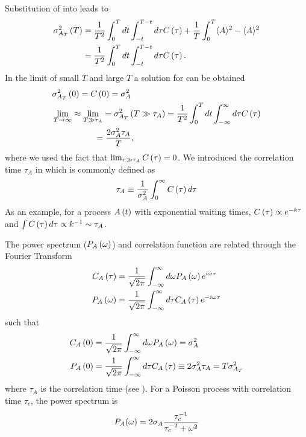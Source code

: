 Substitution of  into  leads to
\begin{align}
\sigma^2_{A_T}\br{T}&=\frac{1}{T^2}\int_0^T dt \int_{-t}^{T-t} d\tau C\br{\tau}+\frac{1}{T}\int_0^T \avg{A}^2-\avg{A}^2\\
\elabel{si:time_av_var4}
&=\frac{1}{T^2}\int_0^T dt \int_{-t}^{T-t} d\tau C\br{\tau}.
\end{align}
In the limit of small $T$ and large $T$ a solution for  can be obtained
\begin{align}
\elabel{si:limT_0_corr}
&\sigma^2_{A_T}\br{0}=C\br{0}=\sigma_A^2\\
\elabel{si:limT_infty_corr}
&\lim_{T\to\infty}\approx \lim_{T\gg \tau_A}=\sigma^2_{A_T}\br{T\gg \tau_A}=\frac{1}{T^2}\int_0^T dt \int_{-\infty}^{\infty} d\tau
C\br{\tau}\nonumber\\
&\quad\qquad\qquad=\frac{2\sigma_A^2\tau_A}{T},
\end{align}
where we used the fact that $\lim_{\tau\gg\tau_A} C\left ( \tau\right )=0$. We introduced the correlation time $\tau_A$ in 
which is commonly defined as
\begin{align}
\elabel{si:corr_time}
\tau_A\equiv \frac{1}{\sigma^2_A}\int_0^\infty C\br{\tau} d\tau
\end{align}
As an example, for a process $A\left ( t\right )$ with exponential waiting times, $C\left ( \tau\right )\propto e^{-k \tau}$ and $\int C\left ( \tau\right )d\tau \propto
k^{-1} \sim \tau_A$.

The power spectrum ($P_A\left ( \omega\right )$) and correlation function are related through the Fourier Transform
\begin{align}
\elabel{si:rel_pow_lap}
C_A\br{\tau}&=\frac{1}{\sqrt{2\pi}}\int_{-\infty}^\infty d\omega P_A\br{\omega}e^{i\omega\tau}\\
P_A\br{\omega}&=\frac{1}{\sqrt{2\pi}}\int_{-\infty}^\infty d\tau C_A\br{\tau}e^{-i\omega\tau}
\end{align}
such that
\begin{align}
C_A\left ( 0\right )&=\frac{1}{\sqrt{2\pi}}\int_{-\infty}^\infty d\omega P_A\left ( \omega\right )=\sigma_A^2\\
P_A\left ( 0\right )&=\frac{1}{\sqrt{2\pi}}\int_{-\infty}^\infty d\tau C_A\left ( \tau\right )\equiv 2\sigma_A^2\tau_A=T\sigma^2_{A_T}
\end{align}
where $\tau_A$ is the correlation time (see ).
For a Poisson process with correlation time $\tau_c$, the power spectrum is
\begin{equation}
 P_A(\omega) = 2 \sigma_A \frac{\tau_c^{-1}}{\tau_c^{-2} + \omega^2}
 \elabel{PoissonPow}
\end{equation}



